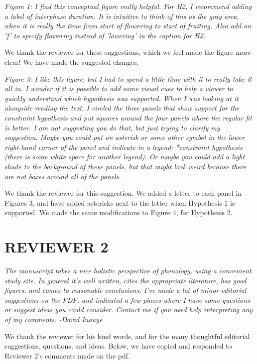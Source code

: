 \documentclass[10.95pt,a4paper]{letter}
\begin{document}
\par \emph{Figure 1: I find this conceptual figure really helpful.  For H2, I recommend adding a label of interphase duration.  It is intuitive to think of this as the gray area, when it is really the time from start of flowering to start of fruiting.  Also add an 'f' to specify flowering instead of 'lowering' in the caption for H2.} 
\par We thank the reviewer for these suggestions, which we feel made the figure more clear! We have made the suggested changes. 


\par \emph{Figure 3:  I like this figure, but I had to spend a little time with it to really take it all in.  I wonder if it is possible to add some visual cues to help a viewer to quickly understand which hypothesis was supported.  When I was looking at it alongside reading the text, I circled the three panels that show support for the constraint hypothesis and put squares around the four panels where the regular fit is better.  I am not suggesting you do that, but just trying to clarify my suggestion.  Maybe you could put an asterisk or some other symbol in the lower right-hand corner of the panel and indicate in a legend: *constraint hypothesis (there is some white space for another legend). Or maybe you could add a light shade to the background of these panels, but that might look weird because there are not boxes around all of the panels.} 
\par We thank the reviewer for this suggestion. We added a letter to each panel in Figures 3, and have added asterisks next to the letter when Hypothesis 1 is supported. We made the same modifications to Figure 4, for Hypothesis 2. 
\section {REVIEWER 2}

\par \emph{The manuscript takes a nice holistic perspective of phenology, using a convenient study site. In general it's well written, cites the appropriate literature, has good figures, and comes to reasonable conclusions. I've made a lot of minor editorial suggestions on the PDF, and indicated a few places where I have some questions or suggest ideas you could consider. Contact me if you need help interpreting any of my comments. 
-David Inouye}
\par We thank the reviewer for his kind words, and for the many thoughtful editorial suggestions, questions, and ideas. Below, we have copied and responded to Reviewer 2's comments made on the pdf.
\end{document}
